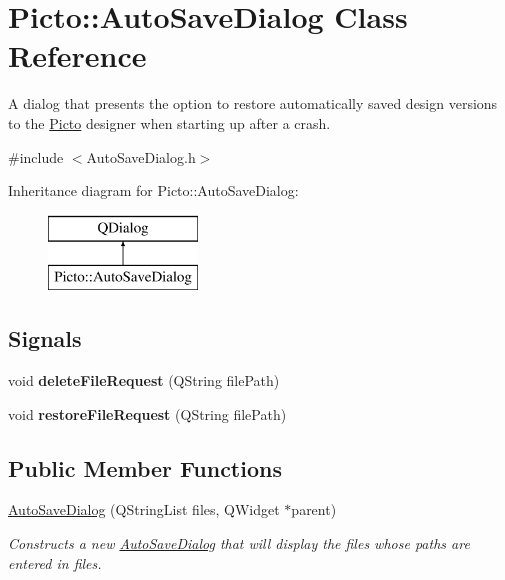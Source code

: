 \hypertarget{class_picto_1_1_auto_save_dialog}{\section{Picto\-:\-:Auto\-Save\-Dialog Class Reference}
\label{class_picto_1_1_auto_save_dialog}
}


A dialog that presents the option to restore automatically saved design versions to the \hyperlink{namespace_picto}{Picto} designer when starting up after a crash.  




{\ttfamily \#include $<$Auto\-Save\-Dialog.\-h$>$}

Inheritance diagram for Picto\-:\-:Auto\-Save\-Dialog\-:\begin{figure}[H]
\begin{center}
\leavevmode
\includegraphics[height=2.000000cm]{class_picto_1_1_auto_save_dialog}
\end{center}
\end{figure}
\subsection*{Signals}
\begin{DoxyCompactItemize}
\item 
\hypertarget{class_picto_1_1_auto_save_dialog_a181f16c52ce6498a2eeca6c37eeba4df}{void {\bfseries delete\-File\-Request} (Q\-String file\-Path)}\label{class_picto_1_1_auto_save_dialog_a181f16c52ce6498a2eeca6c37eeba4df}

\item 
\hypertarget{class_picto_1_1_auto_save_dialog_ae46c2e3d8b1f09e961a1ba7ea095dfb7}{void {\bfseries restore\-File\-Request} (Q\-String file\-Path)}\label{class_picto_1_1_auto_save_dialog_ae46c2e3d8b1f09e961a1ba7ea095dfb7}

\end{DoxyCompactItemize}
\subsection*{Public Member Functions}
\begin{DoxyCompactItemize}
\item 
\hypertarget{class_picto_1_1_auto_save_dialog_ab401992e2aaca2faa0aeb6a1f9ff84cc}{\hyperlink{class_picto_1_1_auto_save_dialog_ab401992e2aaca2faa0aeb6a1f9ff84cc}{Auto\-Save\-Dialog} (Q\-String\-List files, Q\-Widget $\ast$parent)}\label{class_picto_1_1_auto_save_dialog_ab401992e2aaca2faa0aeb6a1f9ff84cc}

\begin{DoxyCompactList}\small\item\em Constructs a new \hyperlink{class_picto_1_1_auto_save_dialog}{Auto\-Save\-Dialog} that will display the files whose paths are entered in files. \end{DoxyCompactList}\end{DoxyCompactItemize}


